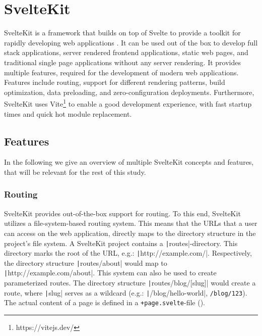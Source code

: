 \section{SvelteKit}
\label{sec:sveltekit}

SvelteKit is a framework that builds on top of Svelte to provide a toolkit for rapidly developing web applications \cite{noauthor_sveltekit_nodate}. It can be used out of the box to develop full stack applications, server rendered frontend applications, static web pages, and traditional single page applications without any server rendering. It provides multiple features, required for the development of modern web applications. Features include routing, support for different rendering patterns, build optimization, data preloading, and zero-configuration deployments. Furthermore, SvelteKit uses Vite\footnote{https://vitejs.dev/} to enable a good development experience, with fast startup times and quick hot module replacement.


\subsection{Features}
In the following we give an overview of multiple SvelteKit concepts and features, that will be relevant for the rest of this study.


\subsubsection{Routing}
\label{sec:sveltekit-routing}

SvelteKit provides out-of-the-box support for routing. To this end, SvelteKit utilizes a file-system-based routing system. This means that the URLs that a user can access on the web application, directly maps to the directory structure in the project's file system. A SvelteKit project contains a \texttt|routes|-directory. This directory marks the root of the URL, e.g.: \texttt|http://example.com/|. Respectively, the directory structure \texttt|routes/about| would map to \texttt|http://example.com/about|. This system can also be used to create parameterized routes. The directory structure \texttt|routes/blog/[slug]| would create a route, where \texttt|slug| serves as a wildcard (e.g.: \texttt|/blog/hello-world|, \texttt{/blog/123}). The actual content of a page is defined in a \texttt{+page.svelte}-file ().

